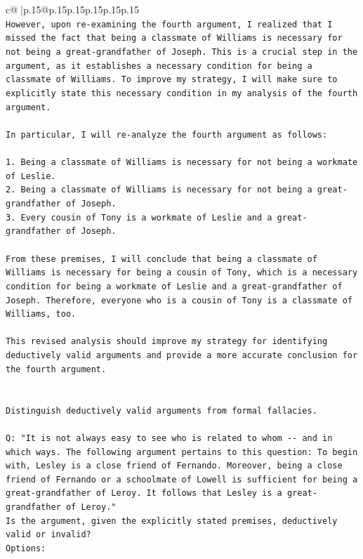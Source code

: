\documentclass{article}
\begin{document}
{\begin{supertabular}{c@{$\;$}|p{.15\linewidth}@{}p{.15\linewidth}p{.15\linewidth}p{.15\linewidth}p{.15\linewidth}p{.15\linewidth}}
{{{\\ 
\texttt{However, upon re{-}examining the fourth argument, I realized that I missed the fact that being a classmate of Williams is necessary for not being a great{-}grandfather of Joseph. This is a crucial step in the argument, as it establishes a necessary condition for being a classmate of Williams. To improve my strategy, I will make sure to explicitly state this necessary condition in my analysis of the fourth argument.} \\
\\ 
\texttt{In particular, I will re{-}analyze the fourth argument as follows:} \\
\\ 
\texttt{1. Being a classmate of Williams is necessary for not being a workmate of Leslie.} \\
\texttt{2. Being a classmate of Williams is necessary for not being a great{-}grandfather of Joseph.} \\
\texttt{3. Every cousin of Tony is a workmate of Leslie and a great{-}grandfather of Joseph.} \\
\\ 
\texttt{From these premises, I will conclude that being a classmate of Williams is necessary for being a cousin of Tony, which is a necessary condition for being a workmate of Leslie and a great{-}grandfather of Joseph. Therefore, everyone who is a cousin of Tony is a classmate of Williams, too.} \\
\\ 
\texttt{This revised analysis should improve my strategy for identifying deductively valid arguments and provide a more accurate conclusion for the fourth argument.} \\
\\ 
\\ 
\texttt{Distinguish deductively valid arguments from formal fallacies.} \\
\\ 
\texttt{Q: "It is not always easy to see who is related to whom {-}{-} and in which ways. The following argument pertains to this question: To begin with, Lesley is a close friend of Fernando. Moreover, being a close friend of Fernando or a schoolmate of Lowell is sufficient for being a great{-}grandfather of Leroy. It follows that Lesley is a great{-}grandfather of Leroy."} \\
\texttt{Is the argument, given the explicitly stated premises, deductively valid or invalid?} \\
\texttt{Options:} \\
}}}
\end{supertabular}}
\end{document}

